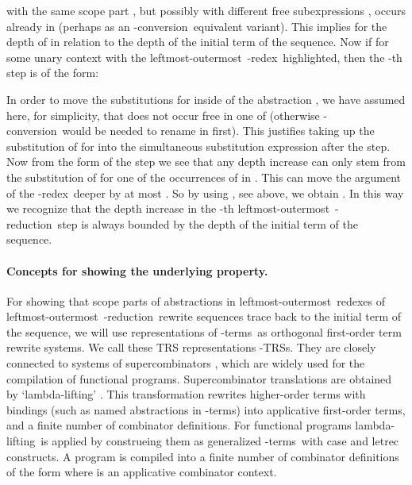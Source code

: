 \documentclass[
submission
]{dmtcs-episciences-tampered}
\newcommand{\nb}{\nobreakdash}
\newcommand{\TRS}{TRS}
\newcommand{\lambdaterm}{\nb-term}
\newcommand{\lambdaterms}{\lambdaterm{s}}
\newcommand{\lambdalifting}{lambda-lif\-ting}
\newcommand{\betareduction}{\nb-re\-duc\-tion}
\newcommand{\betaredex}{\nb-re\-dex}
\newcommand{\alphaconversion}{\nb-con\-ver\-sion}
\newcommand{\lo}{left\-most-outer\-most}
\newcommand{\lTRS}{\hspace*{-0.5pt}\nb-\hspace*{-0.5pt}\TRS}
\newcommand{\lTRSs}{\lTRS{s}}
\theoremstyle{plain}
\theoremstyle{definition}
\begin{document}
  with the same scope part , but possibly with different free subexpressions ,   
  occurs already in  (perhaps as an \alphaconversion\ equivalent variant).
  This implies 
  for the depth of  in relation to the depth of the initial term  of the sequence.
  Now if  for some unary context 
  with the \lo\ \betaredex\ highlighted, then the \nb-th step is of the form:
  
  In order to move the substitutions for  inside of the abstraction ,
  we have assumed here, for simplicity, that  does not occur free in one of 
  (otherwise \alphaconversion\ would be needed to rename  in  first).
  This justifies taking up the substitution of  for  into the simultaneous substitution expression 
  after the  step. 
  Now from the form of the step 
  we see that any depth increase can only stem from the substitution of  for one of the occurrences of  in .
  This can move the argument  of the \betaredex\ deeper by at most .
  So by using , see above, we obtain 
    .
  In this way we recognize that the depth increase in the \nb-th \lo\ \betareduction\ step is always bounded by the depth  of the initial term  of the sequence.


\paragraph{Concepts for showing the underlying property.}
  For showing that scope parts of abstractions in \lo\ redexes of \lo\ \betareduction\ rewrite sequences trace back to the initial term of the sequence,
  we will use representations of \lambdaterms\ as orthogonal first-order term rewrite systems.
  We call these TRS representations \lTRSs.
  They are closely connected to systems of supercombinators \cite{hugh:1982:report,hugh:1982},
  which are widely used for the compilation of functional programs. 
Supercombinator translations are obtained by `\lambdalifting' \cite{peyt:1987}.
  This transformation rewrites higher-order terms with bindings (such as named abstractions in \lambdaterms)
  into applicative first-order terms, and a finite number of combinator definitions.
  For functional programs \lambdalifting\ is applied by construeing them as 
  generalized \lambdaterms\ with \textsf{case} and \textsf{letrec} constructs.
  A program is compiled into a finite number of combinator definitions 
  of the form  where  is an applicative combinator context.
  
\end{document}
